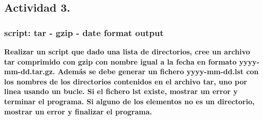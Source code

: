 \documentclass[a4paper,11pt,spanish]{article} %
\begin{document}
\subsection{Actividad 3.}

\subsubsection{script: tar - gzip - date format output}

\textbf{Realizar un script que dado una lista de directorios, cree un archivo tar comprimido con gzip
con nombre igual a la fecha en formato yyyy-mm-dd.tar.gz. 
Además se debe generar un fichero yyyy-mm-dd.lst con los nombres de los directorios
contenidos en el archivo tar, uno por linea usando un bucle. 
Si el fichero lst existe, mostrar un error y terminar el programa.
Si alguno de los elementos no es un directorio, mostrar un error y finalizar el programa.}
\end{document}
